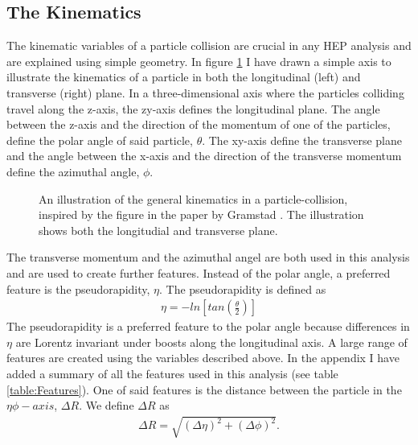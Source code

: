 \subsection{The Kinematics}
The kinematic variables of a particle collision are crucial in any \ac{HEP} analysis and are explained using simple 
geometry. In figure \ref{fig:Kinematics} I have drawn a simple axis to illustrate the kinematics of a particle in both the 
longitudinal (left) and transverse (right) plane. In a three-dimensional axis where the particles colliding travel along the 
z-axis, the zy-axis defines the longitudinal plane.  The angle between the z-axis and the direction of the momentum of
one of the particles, define the polar angle of said particle, $\theta$. The xy-axis define the transverse plane and the 
angle between the x-axis and the direction of the transverse momentum define the azimuthal angle, $\phi$.
\begin{figure}
    \centering
    \caption[An illustration of the general kinematics in a particle-collision.]{An illustration of the general kinematics in a particle-collision, inspired by the 
    figure in the paper by Gramstad \cite{gramstad_searches_nodate}. The illustration shows both the 
    longitudial and transverse plane. }
    \label{fig:Kinematics}
\end{figure}
The transverse momentum and the azimuthal angel are both used in this analysis and are used to create further features. 
Instead of the polar angle, a preferred feature is the pseudorapidity, $\eta$. The pseudorapidity is defined as 
\begin{align}\label{eq:eta}
    \eta = -ln\left[tan\left(\frac{\theta}{2}\right)\right]
\end{align}
The pseudorapidity is a preferred feature to the polar angle because differences in $\eta$ are Lorentz invariant under boosts 
along the longitudinal axis. A large range of features are created using the variables described above. In the appendix I have 
added a summary of all the features used in this analysis (see table \ref{table:Features}). One of said features is the distance 
between the particle in the $\eta\phi-axis$, $\Delta R$. We define $\Delta R$ as 
\begin{align}
    \Delta R = \sqrt{(\Delta \eta)^2 + (\Delta \phi)^2}.
\end{align}
